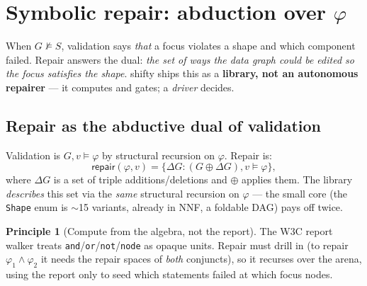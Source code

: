 \documentclass[11pt]{article}
\newcommand{\conf}{\models}                       %
\newcommand{\Repair}{\mathsf{repair}}
\newcommand{\code}[1]{\texttt{#1}}
\theoremstyle{definition}
\newtheorem{principle}{Principle}[section]
\begin{document}
\section{Symbolic repair: abduction over $\varphi$}\label{sec:repair}

When $G\not\models S$, validation says \emph{that} a focus violates a shape and
which component failed. Repair answers the dual: \emph{the set of ways the data
graph could be edited so the focus satisfies the shape}. shifty ships this as a
\textbf{library, not an autonomous repairer} --- it computes and gates; a
\emph{driver} decides.

\subsection{Repair as the abductive dual of validation}
Validation is $G,v\conf\varphi$ by structural recursion on $\varphi$. Repair is:
\[
\Repair(\varphi,v)=\{\Delta G : (G\oplus\Delta G),v\conf\varphi\},
\]
where $\Delta G$ is a set of triple additions/deletions and $\oplus$ applies
them. The library \emph{describes} this set via the \emph{same} structural
recursion on $\varphi$ --- the small core (the \code{Shape} enum is $\sim$15
variants, already in NNF, a foldable DAG) pays off twice.
\begin{principle}[Compute from the algebra, not the report]
The W3C report walker treats \code{and}/\code{or}/\code{not}/\code{node} as opaque
units. Repair must drill in (to repair $\varphi_1\wedge\varphi_2$ it needs the
repair spaces of \emph{both} conjuncts), so it recurses over the arena, using the
report only to seed which statements failed at which focus nodes.
\end{principle}
\end{document}
